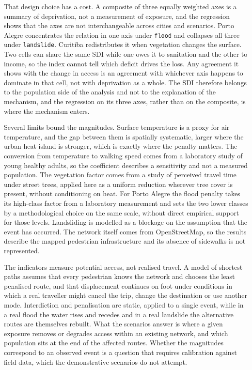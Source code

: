 That design choice has a cost. A composite of three equally weighted axes is a summary of deprivation, not a measurement of exposure, and the regression shows that the axes are not interchangeable across cities and scenarios. Porto Alegre concentrates the relation in one axis under \texttt{flood} and collapses all three under \texttt{landslide}. Curitiba redistributes it when vegetation changes the surface. Two cells can share the same SDI while one owes it to sanitation and the other to income, so the index cannot tell which deficit drives the loss. Any agreement it shows with the change in access is an agreement with whichever axis happens to dominate in that cell, not with deprivation as a whole. The SDI therefore belongs to the population side of the analysis and not to the explanation of the mechanism, and the regression on its three axes, rather than on the composite, is where the mechanism enters.

Several limits bound the magnitudes. Surface temperature is a proxy for air temperature, and the gap between them is spatially systematic, larger where the urban heat island is stronger, which is exactly where the penalty matters. The conversion from temperature to walking speed comes from a laboratory study of young healthy adults, so the coefficient describes a sensitivity and not a measured population. The vegetation factor comes from a study of perceived travel time under street trees, applied here as a uniform reduction wherever tree cover is present, without conditioning on heat. For Porto Alegre the flood penalty takes its high-class factor from a laboratory measurement and sets the two lower classes by a methodological choice on the same scale, without direct empirical support for those levels. Landsliding is modelled as a blockage on the assumption that the event has occurred. The network itself comes from OpenStreetMap, so the results describe the mapped pedestrian infrastructure and its absence of sidewalks is not represented.

The indicators measure potential access, not realised travel. A model of shortest paths assumes that every pedestrian knows the network and chooses the least penalised route, and that displacement continues on foot under conditions in which a real traveller might cancel the trip, change the destination or use another mode. Interdiction and penalisation are static, applied to a single event, while in a real flood the water rises and recedes and in a real landslide the alternative routes are themselves rebuilt. What the scenarios answer is where a given exposure removes or degrades access within an existing network, and which population sits at the end of the affected routes. Whether the magnitudes correspond to an observed event is a question that requires calibration against field data, which the demonstrative scenarios do not attempt.

